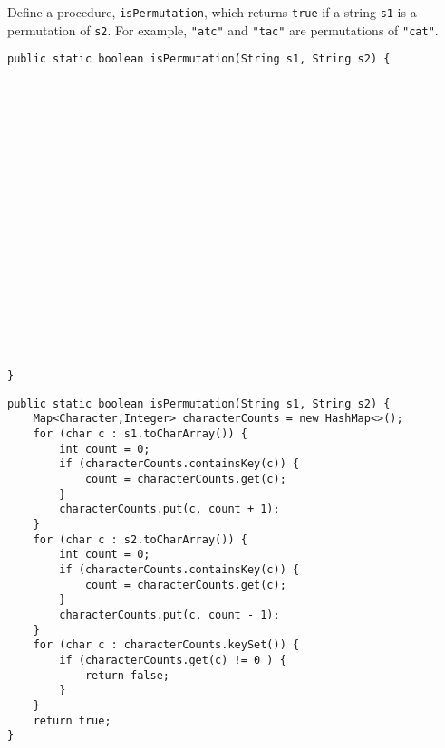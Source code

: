 \begin{blocksection}
\question Define a procedure, \lstinline$isPermutation$, which returns
\lstinline$true$ if a string \lstinline$s1$ is a permutation of \lstinline$s2$.
For example, \lstinline$"atc"$ and \lstinline$"tac"$ are permutations of
\lstinline$"cat"$.

\ifprintanswers\else
\begin{lstlisting}
public static boolean isPermutation(String s1, String s2) {




















}
\end{lstlisting}
\fi

\begin{solution}
\begin{lstlisting}
public static boolean isPermutation(String s1, String s2) {
    Map<Character,Integer> characterCounts = new HashMap<>();
    for (char c : s1.toCharArray()) {
        int count = 0;
        if (characterCounts.containsKey(c)) {
            count = characterCounts.get(c);
        }
        characterCounts.put(c, count + 1);
    }
    for (char c : s2.toCharArray()) {
        int count = 0;
        if (characterCounts.containsKey(c)) {
            count = characterCounts.get(c);
        }
        characterCounts.put(c, count - 1);
    }
    for (char c : characterCounts.keySet()) {
        if (characterCounts.get(c) != 0 ) {
            return false;
        }
    }
    return true;
}
\end{lstlisting}
\end{solution}
\end{blocksection}
